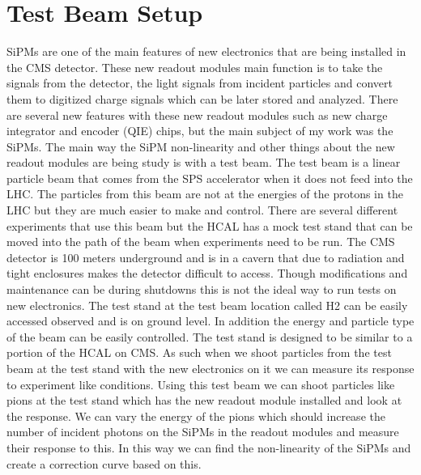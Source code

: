\section{Test Beam Setup}

SiPMs are one of the main features of new electronics that are being installed in the CMS detector. These new readout modules main function is to take the signals from the detector, the light signals from incident particles and convert them to digitized charge signals which can be later stored and analyzed. There are several new features with these new readout modules such as new charge integrator and encoder (QIE) chips, but the main subject of my work was the SiPMs. The main way the SiPM non-linearity and other things about the new readout modules are being study is with a test beam. The test beam is a linear particle beam that comes from the SPS accelerator when it does not feed into the LHC. The particles from this beam are not at the energies of the protons in the LHC but they are much easier to make and control. There are several different experiments that use this beam but the HCAL has a mock test stand that can be moved into the path of the beam when experiments need to be run. The CMS detector is 100 meters underground and is in a cavern that due to radiation and tight enclosures makes the detector difficult to access. Though modifications and maintenance can be during shutdowns this is not the ideal way to run tests on new electronics. The test stand at the test beam location called H2 can be easily accessed observed and is on ground level. In addition the energy and particle type of the beam can be easily controlled. The test stand is designed to be similar to a portion of the HCAL on CMS. As such when we shoot particles from the test beam at the test stand with the new electronics on it we can measure its response to experiment like conditions. Using this test beam we can shoot particles like pions at the test stand which has the new readout module installed and look at the response. We can vary the energy of the pions which should increase the number of incident photons on the SiPMs in the readout modules and measure their response to this. In this way we can find the non-linearity of the SiPMs and create a correction curve based on this.

